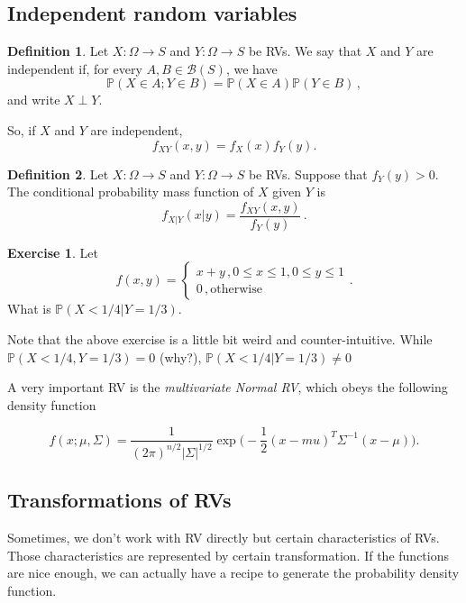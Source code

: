 \documentclass[
  openany]{book}
\theoremstyle{definition}
\newtheorem{definition}{Definition}[chapter]
\theoremstyle{definition}
\theoremstyle{definition}
\newtheorem{exercise}{Exercise}[chapter]
\theoremstyle{definition}
\theoremstyle{remark}
\begin{document}
\subsection{Independent random variables}\label{independent-random-variables}

\begin{definition}
Let \(X:\Omega \to S\) and \(Y: \Omega \to S\) be RVs.
We say that \(X\) and \(Y\) are independent if,
for every \(A, B \in \mathcal{B}(S)\), we have
\[ \mathbb{P}( X \in A; Y \in B) = \mathbb{P}(X \in A) \mathbb{P}(Y \in B) \,, \]
and write \(X \perp Y\).
\end{definition}

So, if \(X\) and \(Y\) are independent,
\[f_{XY}(x,y) = f_X(x) f_Y(y).\]

\begin{definition}
Let \(X:\Omega \to S\) and \(Y: \Omega \to S\) be RVs.
Suppose that \(f_Y(y) >0\).
The conditional probability mass function of \(X\) given \(Y\) is
\[ f_{X|Y} (x|y) = \frac{f_{XY}(x,y)}{f_Y(y)} \,.\]
\end{definition}

\begin{exercise}
Let
\[ f(x,y) = \begin{cases} x+y \,, 0\leq x \leq 1, 0 \leq y \leq 1\\
            0\,, \text{otherwise} \end{cases}.\]
What is \(\mathbb{P}( X < 1/4 \vert Y = 1/3)\).
\end{exercise}

Note that the above exercise is a little bit weird and counter-intuitive.
While
\(\mathbb{P}( X < 1/4 , Y = 1/3) = 0\) (why?),
\(\mathbb{P}( X < 1/4 | Y = 1/3) \not= 0\)

A very important RV is the \emph{multivariate Normal RV}, which obeys the
following density function

\[f(x; \mu, \Sigma) = \frac{1}{(2\pi)^{n/2} | \Sigma |^{1/2}} \exp\big( -\frac{1}{2} (x-mu)^T \Sigma^{-1} (x-\mu)  \big).\]

\subsection{Transformations of RVs}\label{transformations-of-rvs}

Sometimes, we don't work with RV directly but certain characteristics of RVs.
Those characteristics are represented by certain transformation.
If the functions are nice enough, we can actually have a recipe to generate
the probability density function.
\end{document}
